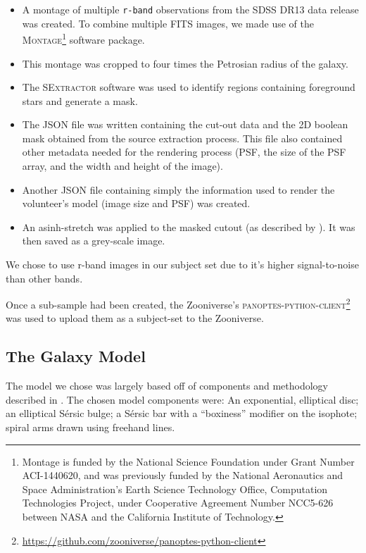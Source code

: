 \documentclass[../main.tex]{subfiles}
\begin{document}
\begin{itemize}
\item A montage of multiple \texttt{r-band} observations from the SDSS DR13 data release was created. To combine multiple FITS images, we made use of the \textsc{Montage}\footnote{Montage is funded by the National Science Foundation under Grant Number ACI-1440620, and was previously funded by the National Aeronautics and Space Administration's Earth Science Technology Office, Computation Technologies Project, under Cooperative Agreement Number NCC5-626 between NASA and the California Institute of Technology.} software package.
\item This montage was cropped to four times the Petrosian radius of the galaxy.
\item The \textsc{SExtractor} software \citep{source-extractor} was used to identify regions containing foreground stars and generate a mask.
\item The JSON file was written containing the cut-out data and the 2D boolean mask obtained from the source extraction process. This file also contained other metadata needed for the rendering process (PSF, the size of the PSF array, and the width and height of the image).
\item Another JSON file containing simply the information used to render the volunteer's model (image size and PSF) was created.
\item An asinh-stretch was applied to the masked cutout (as described by \citealt{Lupton2003:astro-ph/0312483v1}). It was then saved as a grey-scale image.
\end{itemize}

We chose to use r-band images in our subject set due to it's higher signal-to-noise than other bands.

Once a sub-sample had been created, the Zooniverse's \textsc{panoptes-python-client}\footnote{\url{https://github.com/zooniverse/panoptes-python-client}} was used to upload them as a subject-set to the Zooniverse.


\subsection{The Galaxy Model}
\label{section:galaxy-model}

The model we chose was largely based off of components and methodology described in \citet{galfit-paper}. The chosen model components were: An exponential, elliptical disc; an elliptical S\'ersic bulge; a S\'ersic bar with a ``boxiness'' modifier on the isophote; spiral arms drawn using freehand lines.
\end{document}
